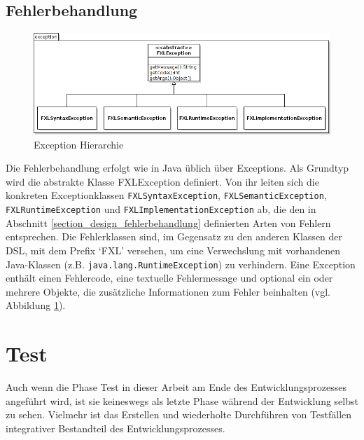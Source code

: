 \section{Fehlerbehandlung}

\begin{figure}[ht]
\begin{center}
\includegraphics[scale=0.5]{figures/uml_exception_hierarchy_neu}
\end{center}

\caption{Exception Hierarchie}
\label{abb_exception_hierarchie}
\end{figure}

Die Fehlerbehandlung erfolgt wie in Java üblich über Exceptions. Als Grundtyp wird die abstrakte Klasse FXLException definiert. Von ihr leiten sich die konkreten Exceptionklassen \texttt{FXLSyntaxException}, \texttt{FXLSemanticException}, \texttt{FXLRuntimeException} und \texttt{FXLImplementationException} ab, die den in Abschnitt \ref{section_design_fehlerbehandlung} definierten Arten von Fehlern entsprechen. Die Fehlerklassen sind, im Gegensatz zu den anderen Klassen der DSL, mit dem Prefix `FXL' versehen, um eine Verwechslung mit vorhandenen Java-Klassen (z.B. \texttt{java.\-lang.\-Runtime\-Exception}) zu verhindern. Eine Exception enthält einen Fehlercode, eine textuelle Fehlermessage und optional ein oder mehrere Objekte, die zusätzliche Informationen zum Fehler beinhalten (vgl. Abbildung \ref{abb_exception_hierarchie}).




\chapter{Test}
\label{chapter_test}

Auch wenn die Phase Test in dieser Arbeit am Ende des Entwicklungsprozesses angeführt wird, ist sie keineswegs als letzte Phase während der Entwicklung selbst zu sehen. Vielmehr ist das Erstellen und wiederholte Durchführen von Testfällen integrativer Bestandteil des Entwicklungsprozesses.

